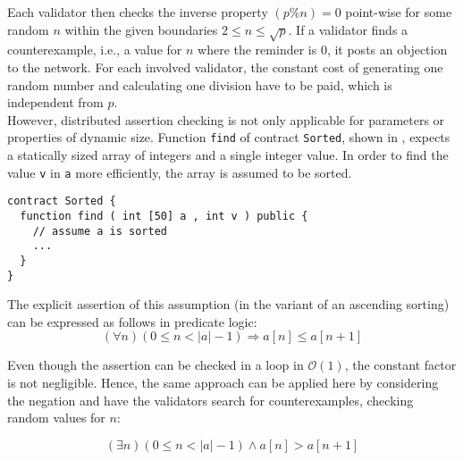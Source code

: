 Each validator then checks the inverse property $(p \% n) = 0$ point-wise for some random $n$ within the given boundaries $2 \le n \le \sqrt{p}$. If a validator finds a counterexample, i.e., a value for $n$ where the reminder is $0$, it posts an objection to the network. For each involved validator, the constant cost of generating one random number and calculating one division have to be paid, which is independent from $p$. \\
However, distributed assertion checking is not only applicable for parameters or properties of dynamic size. Function \texttt{find} of contract \texttt{Sorted}, shown in , expects a statically sized array of integers and a single integer value. In order to find the value \texttt{v} in \texttt{a} more efficiently, the array is assumed to be sorted. 

\begin{lstlisting}[caption=Smart contract expecting a sorted array \cite{thiemann_2020}, numbers=none, language=Solidity, label=lst:sorted]
contract Sorted {
  function find ( int [50] a , int v ) public {
    // assume a is sorted
    ...
  }
}
\end{lstlisting}

The explicit assertion of this assumption (in the variant of an ascending sorting) can be expressed as follows in predicate logic:
\begin{equation}\label{eq:sorted}
	(\forall n) (0 \leq n < |a| - 1) \Rightarrow a[n] \leq a[n+1]
\end{equation}

Even though the assertion can be checked in a loop in $\mathcal{O}(1)$, the constant factor is not negligible. Hence, the same approach can be applied here by considering the negation and have the validators search for counterexamples, checking random values for $n$:
 
\begin{equation}\label{eq:sorted_neg}
	(\exists n) (0 \leq n < |a| - 1) \wedge a[n] > a[n+1]
\end{equation}

